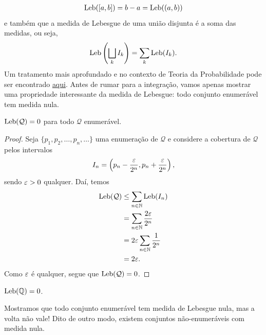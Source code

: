         \begin{align*}
            \mathrm{Leb}([a,b]) = b-a = \mathrm{Leb}((a,b))
        \end{align*}
        e também que a medida de Lebesgue de uma união disjunta é a soma das medidas, ou seja,
        \begin{equation*}
            \mathrm{Leb}\left( \bigsqcup_k I_k \right) = \sum_k \mathrm{Leb}(I_k).
        \end{equation*}
        Um tratamento mais aprofundado e no contexto de Teoria da Probabilidade pode ser
        encontrado \href{https://github.com/leandro-mat/Notas-PTM/blob/master/notas.pdf}{aqui}.
        Antes de rumar para a integração, vamos apenas mostrar uma propriedade interessante
        da medida de Lebesgue: todo conjunto enumerável tem medida nula.
        \begin{proposicao}
        \label{enumeravel-medida-nula}
            $\mathrm{Leb}(\mathcal{Q}) = 0$ para todo $\mathcal{Q}$ enumerável.
        \end{proposicao}
        \begin{proof}
            Seja $\{ p_1, p_2, \dots, p_n, \dots \}$ uma enumeração de $\mathcal{Q}$ e considere
            a cobertura de $\mathcal{Q}$ pelos intervalos
            \begin{equation*}
                I_n = \left(p_n - \frac{\varepsilon}{2^n}, p_n + \frac{\varepsilon}{2^n} \right),
            \end{equation*}
            sendo $\varepsilon>0$ qualquer. Daí, temos
            \begin{align*}
                \mathrm{Leb}(\mathcal{Q}) &\leq \sum_{n\in\mathbb{N}} \mathrm{Leb}(I_n) \\
                                  &= \sum_{n\in\mathbb{N}} \frac{2\varepsilon}{2^n} \\
                                  &= 2\varepsilon\sum_{n\in\mathbb{N}} \frac{1}{2^n} \\
                                  &= 2\varepsilon.
            \end{align*}
            Como $\varepsilon$ é qualquer, segue que $\mathrm{Leb}(\mathcal{Q}) = 0$.
        \end{proof}
        \begin{corolario}
            $\mathrm{Leb}(\mathbb{Q}) = 0$.
        \end{corolario}
        Mostramos que todo conjunto enumerável tem medida de Lebesgue nula, mas a volta
        não vale! Dito de outro modo, existem conjuntos não-enumeráveis com medida nula.
